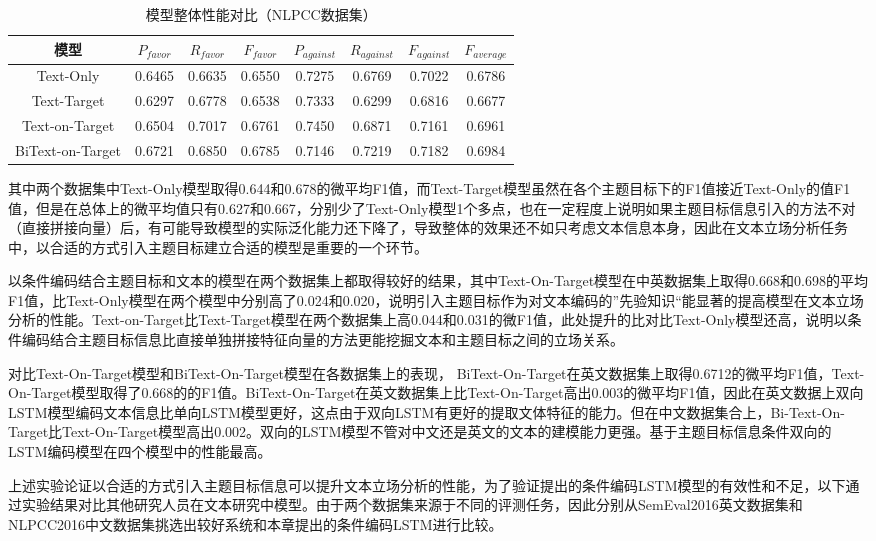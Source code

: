 \begin{table}[htbp]
	\caption[table123]{模型整体性能对比（NLPCC数据集）}
	\label{semeval_all_model}
	\vspace{0.5em}\centering\wuhao
	\begin{tabular}{cccccccc}
		\toprule[1.5pt]
		模型& $P_{favor}$&$R_{favor}$&$F_{favor}$&$P_{against}$&$R_{against}$&$F_{against}$&$F_{average}$ \\
		\midrule[1pt]
		Text-Only&0.6465&0.6635&0.6550&0.7275&0.6769&0.7022&0.6786\\
		Text-Target&0.6297&0.6778&0.6538&0.7333&0.6299&0.6816&0.6677\\
		Text-on-Target&0.6504&0.7017&0.6761&0.7450&0.6871&0.7161&0.6961\\
		BiText-on-Target&0.6721&0.6850&0.6785&0.7146&0.7219&0.7182&0.6984\\
		\bottomrule[1.5pt]
	\end{tabular}
\end{table}

其中两个数据集中Text-Only模型取得0.644和0.678的微平均F1值，而Text-Target模型虽然在各个主题目标下的F1值接近Text-Only的值F1值，但是在总体上的微平均值只有0.627和0.667，分别少了Text-Only模型1个多点，也在一定程度上说明如果主题目标信息引入的方法不对（直接拼接向量）后，有可能导致模型的实际泛化能力还下降了，导致整体的效果还不如只考虑文本信息本身，因此在文本立场分析任务中，以合适的方式引入主题目标建立合适的模型是重要的一个环节。

以条件编码结合主题目标和文本的模型在两个数据集上都取得较好的结果，其中Text-On-Target模型在中英数据集上取得0.668和0.698的平均F1值，比Text-Only模型在两个模型中分别高了0.024和0.020，说明引入主题目标作为对文本编码的”先验知识“能显著的提高模型在文本立场分析的性能。Text-on-Target比Text-Target模型在两个数据集上高0.044和0.031的微F1值，此处提升的比对比Text-Only模型还高，说明以条件编码结合主题目标信息比直接单独拼接特征向量的方法更能挖掘文本和主题目标之间的立场关系。

对比Text-On-Target模型和BiText-On-Target模型在各数据集上的表现， BiText-On-Target在英文数据集上取得0.6712的微平均F1值，Text-On-Target模型取得了0.668的的F1值。BiText-On-Target在英文数据集上比Text-On-Target高出0.003的微平均F1值，因此在英文数据上双向LSTM模型编码文本信息比单向LSTM模型更好，这点由于双向LSTM有更好的提取文体特征的能力。但在中文数据集合上，Bi-Text-On-Target比Text-On-Target模型高出0.002。双向的LSTM模型不管对中文还是英文的文本的建模能力更强。基于主题目标信息条件双向的LSTM编码模型在四个模型中的性能最高。

上述实验论证以合适的方式引入主题目标信息可以提升文本立场分析的性能，为了验证提出的条件编码LSTM模型的有效性和不足，以下通过实验结果对比其他研究人员在文本研究中模型。由于两个数据集来源于不同的评测任务，因此分别从SemEval2016英文数据集和NLPCC2016中文数据集挑选出较好系统和本章提出的条件编码LSTM进行比较。


